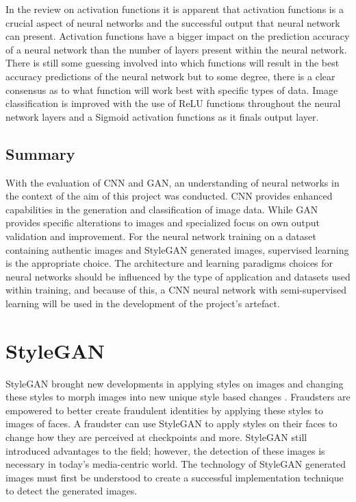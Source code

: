 In the review on activation functions it is apparent that activation functions is a crucial aspect of neural networks and the successful output that neural network can present. Activation functions have a bigger impact on the prediction accuracy of a neural network than the number of layers present within the neural network. There is still some guessing involved into which functions will result in the best accuracy predictions of the neural network but to some degree, there is a clear consensus as to what function will work best with specific types of data. Image classification is improved with the use of ReLU functions throughout the neural network layers and a Sigmoid activation functions as it finals output layer.


\subsection{Summary}

With the evaluation of CNN and GAN, an understanding of neural networks in the context of the aim of this project was conducted. CNN provides enhanced capabilities in the generation and classification of image data. While GAN provides specific alterations to images and specialized focus on own output validation and improvement. For the neural network training on a dataset containing authentic images and StyleGAN generated images, supervised learning is the appropriate choice. The architecture and learning paradigms choices for neural networks should be influenced by the type of application and datasets used within training, and because of this, a CNN neural network with semi-supervised learning will be used in the development of the project's artefact.

\section{StyleGAN}

StyleGAN brought new developments in applying styles on images and changing these styles to morph images into new unique style based changes \citep{Karras2019}. Fraudsters are empowered to better create fraudulent identities by applying these styles to images of faces. A fraudster can use StyleGAN to apply styles on their faces to change how they are perceived at checkpoints and more. StyleGAN still introduced advantages to the field; however, the detection of these images is necessary in today's media-centric world. The technology of StyleGAN generated images must first be understood to create a successful implementation technique to detect the generated images.

